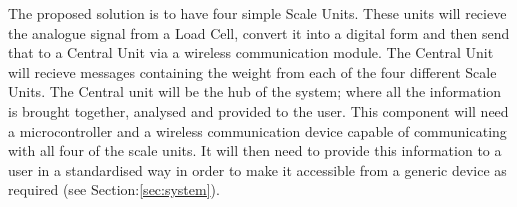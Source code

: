 The proposed solution is to have four simple Scale Units. These units will recieve the analogue signal from a Load Cell, convert it into a digital form and then send that to a Central Unit via a wireless communication module. The Central Unit will recieve messages containing the weight from each of the four different Scale Units. The Central unit will be the hub of the system; where all the information is brought together, analysed and provided to the user. This component will need a microcontroller and a wireless communication device capable of communicating with all four of the scale units. It will then need to provide this information to a user in a standardised way in order to make it accessible from a generic device as required (see Section:\ref{sec:system}).
